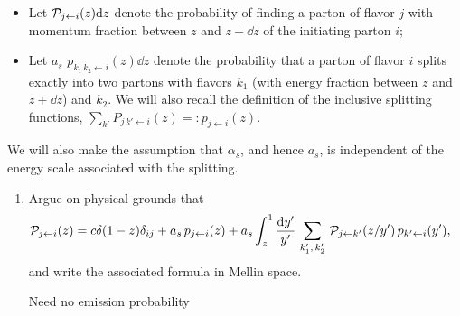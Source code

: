 \begin{problems}
{\begin{itemize}
        \item
            Let \(\mathcal{P}_{j\leftarrow i}(z) \dd z\) denote the probability of finding a parton of flavor \(j\) with momentum fraction between \(z\) and \(z + \dd z\) of the initiating parton \(i\);

        \item
            Let \(a_s\,\,p_{k_1\,k_2 \leftarrow i}(z) \dd z\) denote the probability that a parton of flavor \(i\) splits exactly into two partons with flavors \(k_1\) (with energy fraction between \(z\) and \(z + \dd z\)) and \(k_2\).
            We will also recall the definition of the inclusive splitting functions, \(\sum_{k'} P_{j\,k' \leftarrow i}(z) =: p_{j\leftarrow i}(z)\).
    \end{itemize}

    We will also make the assumption that \(\alpha_s\), and hence \(a_s\), is independent of the energy scale associated with the splitting.


    \begin{enumerate}[label=\roman*)]
        \item
            Argue on physical grounds that
            \begin{align}
                \label{eq:feynman_field_fragmentation_formula}
                \mc P_{j\leftarrow i}(z)
                &=
                c \delta(1-z) \delta_{ij}
                +
                a_s \, p_{j \leftarrow i}(z)
                +
                a_s \int_z^1 \frac{\dd y'}{y'} \, \sum_{k_1',\,k_2'} \,
                    \mc P_{j\leftarrow k'}(z/y')
                    \,
                    p_{k' \leftarrow i}(y')
                ,
            \end{align}
            and write the associated formula in Mellin space.

            {Need no emission probability}


\end{enumerate}}
\end{problems}
